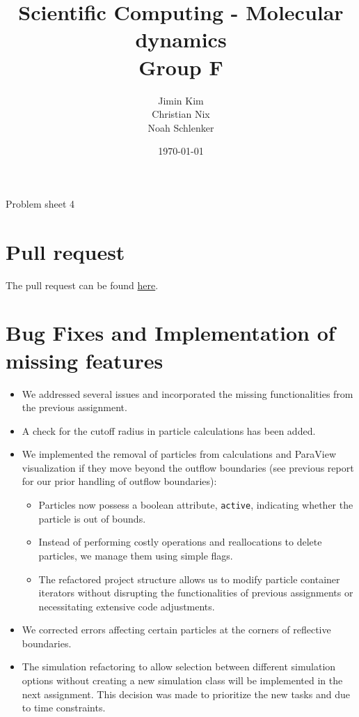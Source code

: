 \documentclass{article}
\title{Scientific Computing - Molecular dynamics \\ Group F}
\author{
    Jimin Kim \\
    Christian Nix \\
    Noah Schlenker
}
\date{\today}
\newcommand{\subtitle}{Problem sheet 4}
\begin{document}
\maketitle

\begin{center}
    \LARGE \subtitle{}
\end{center}

\section{Pull request}
\label{sec:pr}
The pull request can be found \href{https://github.com/noahpy/MolSim-SS24/pull/42}{here}.

\section{Bug Fixes and Implementation of missing features}
\label{sec:fix}

    \begin{itemize}
        \item We addressed several issues and incorporated the missing functionalities from the previous assignment.
        \item A check for the cutoff radius in particle calculations has been added.
        \item We implemented the removal of particles from calculations and ParaView visualization if they move beyond the outflow boundaries (see previous report for our prior handling of outflow boundaries):
        \begin{itemize}
            \item Particles now possess a boolean attribute, \texttt{active}, indicating whether the particle is out of bounds.
            \item Instead of performing costly operations and reallocations to delete particles, we manage them using simple flags.
            \item The refactored project structure allows us to modify particle container iterators without disrupting the functionalities of previous assignments or necessitating extensive code adjustments.
        \end{itemize}
        \item We corrected errors affecting certain particles at the corners of reflective boundaries.
        \item The simulation refactoring to allow selection between different simulation options without creating a new simulation class will be implemented in the next assignment. This decision was made to prioritize the new tasks and due to time constraints.
    \end{itemize}
\end{document}

